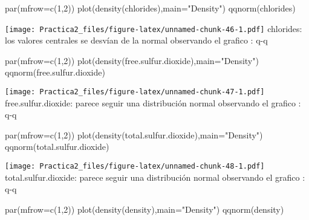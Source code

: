 \documentclass[
]{article}
\newenvironment{Shaded}{\begin{snugshade}}{\end{snugshade}}
\newcommand{\AttributeTok}[1]{\textcolor[rgb]{0.77,0.63,0.00}{#1}}
\newcommand{\DecValTok}[1]{\textcolor[rgb]{0.00,0.00,0.81}{#1}}
\newcommand{\FunctionTok}[1]{\textcolor[rgb]{0.00,0.00,0.00}{#1}}
\newcommand{\NormalTok}[1]{#1}
\newcommand{\StringTok}[1]{\textcolor[rgb]{0.31,0.60,0.02}{#1}}
\begin{document}
\begin{Shaded}
\begin{Highlighting}[]
\FunctionTok{par}\NormalTok{(}\AttributeTok{mfrow=}\FunctionTok{c}\NormalTok{(}\DecValTok{1}\NormalTok{,}\DecValTok{2}\NormalTok{))}
\FunctionTok{plot}\NormalTok{(}\FunctionTok{density}\NormalTok{(chlorides),}\AttributeTok{main=}\StringTok{"Density"}\NormalTok{)}
\FunctionTok{qqnorm}\NormalTok{(chlorides)}
\end{Highlighting}
\end{Shaded}

\texttt{[image: Practica2\_files/figure-latex/unnamed-chunk-46-1.pdf]}
chlorides: los valores centrales se desvían de la normal observando el
grafico : q-q

\begin{Shaded}
\begin{Highlighting}[]
\FunctionTok{par}\NormalTok{(}\AttributeTok{mfrow=}\FunctionTok{c}\NormalTok{(}\DecValTok{1}\NormalTok{,}\DecValTok{2}\NormalTok{))}
\FunctionTok{plot}\NormalTok{(}\FunctionTok{density}\NormalTok{(free.sulfur.dioxide),}\AttributeTok{main=}\StringTok{"Density"}\NormalTok{)}
\FunctionTok{qqnorm}\NormalTok{(free.sulfur.dioxide)}
\end{Highlighting}
\end{Shaded}

\texttt{[image: Practica2\_files/figure-latex/unnamed-chunk-47-1.pdf]}
free.sulfur.dioxide: parece seguir una distribución normal observando el
grafico : q-q

\begin{Shaded}
\begin{Highlighting}[]
\FunctionTok{par}\NormalTok{(}\AttributeTok{mfrow=}\FunctionTok{c}\NormalTok{(}\DecValTok{1}\NormalTok{,}\DecValTok{2}\NormalTok{))}
\FunctionTok{plot}\NormalTok{(}\FunctionTok{density}\NormalTok{(total.sulfur.dioxide),}\AttributeTok{main=}\StringTok{"Density"}\NormalTok{)}
\FunctionTok{qqnorm}\NormalTok{(total.sulfur.dioxide)}
\end{Highlighting}
\end{Shaded}

\texttt{[image: Practica2\_files/figure-latex/unnamed-chunk-48-1.pdf]}
total.sulfur.dioxide: parece seguir una distribución normal observando
el grafico : q-q

\begin{Shaded}
\begin{Highlighting}[]
\FunctionTok{par}\NormalTok{(}\AttributeTok{mfrow=}\FunctionTok{c}\NormalTok{(}\DecValTok{1}\NormalTok{,}\DecValTok{2}\NormalTok{))}
\FunctionTok{plot}\NormalTok{(}\FunctionTok{density}\NormalTok{(density),}\AttributeTok{main=}\StringTok{"Density"}\NormalTok{)}
\FunctionTok{qqnorm}\NormalTok{(density)}
\end{Highlighting}
\end{Shaded}
\end{document}
